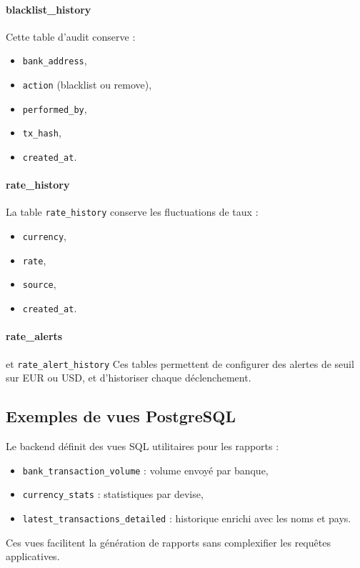 \documentclass[a4paper,12pt]{report}
\begin{document}
\paragraph{blacklist\_history}
Cette table d'audit conserve :
\begin{itemize}[leftmargin=*,nosep]
  \item \texttt{bank\_address},
  \item \texttt{action} (blacklist ou remove),
  \item \texttt{performed\_by},
  \item \texttt{tx\_hash},
  \item \texttt{created\_at}.
\end{itemize}

\paragraph{rate\_history}
La table \texttt{rate\_history} conserve les fluctuations de taux :
\begin{itemize}[leftmargin=*,nosep]
  \item \texttt{currency},
  \item \texttt{rate},
  \item \texttt{source},
  \item \texttt{created\_at}.
\end{itemize}

\paragraph{rate\_alerts} et \texttt{rate\_alert\_history}
Ces tables permettent de configurer des alertes de seuil sur EUR ou USD, et d'historiser chaque déclenchement.

\subsection{Exemples de vues PostgreSQL}
Le backend définit des vues SQL utilitaires pour les rapports :
\begin{itemize}[leftmargin=*,nosep]
  \item \texttt{bank\_transaction\_volume} : volume envoyé par banque,
  \item \texttt{currency\_stats} : statistiques par devise,
  \item \texttt{latest\_transactions\_detailed} : historique enrichi avec les noms et pays.
\end{itemize}
Ces vues facilitent la génération de rapports sans complexifier les requêtes applicatives.
\end{document}
